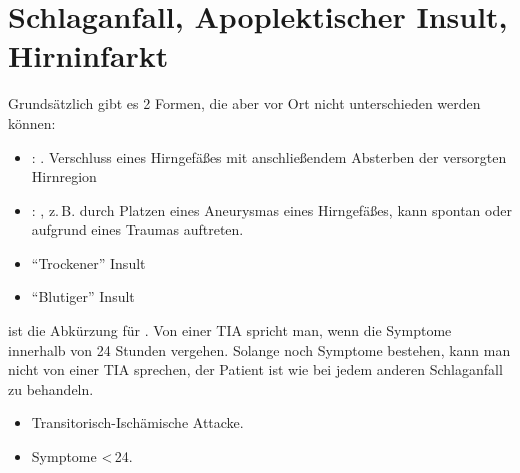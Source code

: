 \clearpage
{}




\section{Schlaganfall, Apoplektischer Insult, Hirninfarkt}
\label{topic:tia}
\label{topic:insult}
\label{topic:schlaganfall}



{%
Grundsätzlich gibt es 2 Formen, die aber vor Ort nicht
unterschieden werden können:
\begin{itemize}
  \item {}:
  . Verschluss eines
  Hirngefäßes mit anschließendem Absterben der versorgten Hirnregion
  \item {}: , z.\,B.
  durch Platzen eines Aneurysmas eines Hirngefäßes, kann spontan
  oder aufgrund eines Traumas auftreten.
\end{itemize}

}
{
\begin{itemize}
  \item \enquote{Trockener} Insult
  \item \enquote{Blutiger} Insult
\end{itemize}

}{}{}{}

{%
\label{topic:tia}
 ist die Abkürzung für .
Von einer TIA spricht man, wenn die Symptome  innerhalb von
24 Stunden vergehen. Solange noch Symptome bestehen, kann
man nicht von einer TIA sprechen, der Patient ist wie bei
jedem anderen Schlaganfall zu behandeln.
\bigskip
}
{
\begin{itemize}
  \item Transitorisch-Ischämische Attacke.
  \item Symptome <\,24\Hour*.
\end{itemize}

}{}{}{}


